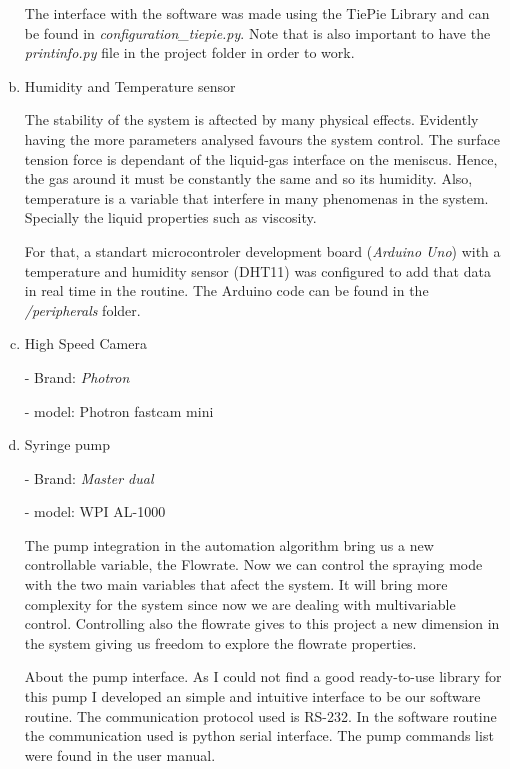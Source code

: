 \begin{enumerate}[a)]
    The interface with the software was made using the TiePie Library\cite{TiePieLib} and can be found in \emph{configuration\_tiepie.py}. Note that is also important to have the \emph{printinfo.py} file in the project folder in order to work.

  \item Humidity and Temperature sensor
  
  The stability of the system is aftected by many physical effects. Evidently having the more parameters analysed favours the system control.
  The surface tension force is dependant of the liquid-gas interface on the meniscus. Hence, the gas around it must be constantly the same and so its humidity.
  Also, temperature is a variable that interfere in many phenomenas in the system. Specially the liquid properties such as viscosity.

  For that, a standart microcontroler development board (\emph{Arduino Uno}) with a temperature and humidity sensor (DHT11) was configured to add that data in real time in the routine.
  The Arduino code can be found in the \emph{/peripherals} folder.
  

  \item High Speed Camera 
  
  - Brand: \emph{Photron}

  - model: Photron fastcam mini


  
  \item Syringe pump
  
  - Brand: \emph{Master dual}

  - model: WPI AL-1000

  The pump integration in the automation algorithm bring us a new controllable variable, the Flowrate. Now we can control the spraying mode with the
    two main variables that afect the system. 
    It will bring more complexity for the system since now we are dealing with multivariable control.
    Controlling also the flowrate gives to this project a new dimension in the system giving us freedom to explore the flowrate properties.

    About the pump interface. As I could not find a good ready-to-use library for this pump I developed an simple and intuitive interface to be our software routine.
    The communication protocol used is RS-232. In the software routine the communication used is python serial interface. The pump commands list were found in the user manual.


\end{enumerate}
